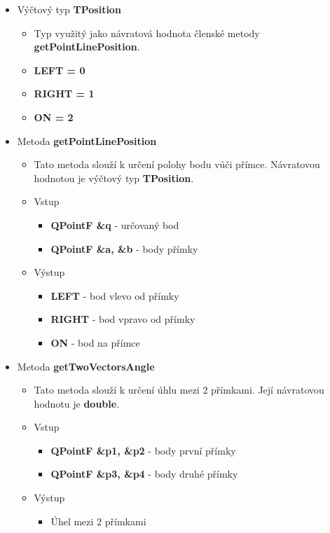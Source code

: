 \documentclass[a4paper, 12pt]{article}
\begin{document}
\begin{itemize}

	\item Výčtový typ \textbf{TPosition}
		\begin{itemize}
			\item Typ využitý jako návratová hodnota členské metody \textbf{getPointLinePosition}.
			\item \textbf{LEFT = 0}
			\item \textbf{RIGHT = 1}
			\item \textbf{ON = 2}
		\end{itemize}

	\item Metoda \textbf{getPointLinePosition}
		\begin{itemize}
			\item Tato metoda slouží k určení polohy bodu vůči přímce. Návratovou hodnotou je výčtový typ \textbf{TPosition}.
			\item Vstup
				\begin{itemize}
					\item \textbf{QPointF \&q} - určovaný bod
					\item \textbf{QPointF \&a, \&b} - body přímky
				\end{itemize}
			\item Výstup
				\begin{itemize}
					\item \textbf{LEFT} - bod vlevo od přímky
					\item \textbf{RIGHT} - bod vpravo od přímky
					\item \textbf{ON} - bod na přímce
				\end{itemize}

		\end{itemize}

	\item Metoda \textbf{getTwoVectorsAngle}
		\begin{itemize}
			\item Tato metoda slouží k určení úhlu mezi 2 přímkami. Její návratovou hodnotu je \textbf{double}.
			\item Vstup
				\begin{itemize}
					\item \textbf{QPointF \&p1, \&p2} - body první přímky
					\item \textbf{QPointF \&p3, \&p4} - body druhé přímky
				\end{itemize}
		
			\item Výstup
				\begin{itemize}
					\item Úhel mezi 2 přímkami
				\end{itemize}			
		\end{itemize}


\end{itemize}
\end{document}
